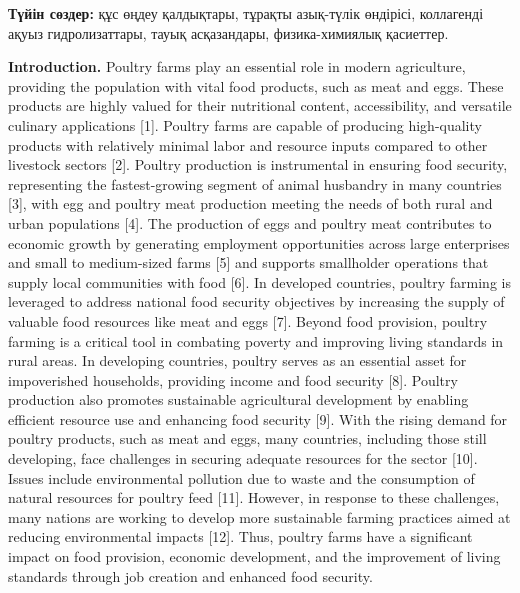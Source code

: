 {\bfseries Түйін сөздер:} құс өңдеу қалдықтары, тұрақты азық-түлік
өндірісі, коллагенді ақуыз гидролизаттары, тауық асқазандары,
физика-химиялық қасиеттер.

{\bfseries Introduction.} Poultry farms play an essential role in modern
agriculture, providing the population with vital food products, such as
meat and eggs. These products are highly valued for their nutritional
content, accessibility, and versatile culinary applications {[}1{]}.
Poultry farms are capable of producing high-quality products with
relatively minimal labor and resource inputs compared to other livestock
sectors {[}2{]}. Poultry production is instrumental in ensuring food
security, representing the fastest-growing segment of animal husbandry
in many countries {[}3{]}, with egg and poultry meat production meeting
the needs of both rural and urban populations {[}4{]}. The production of
eggs and poultry meat contributes to economic growth by generating
employment opportunities across large enterprises and small to
medium-sized farms {[}5{]} and supports smallholder operations that
supply local communities with food {[}6{]}. In developed countries,
poultry farming is leveraged to address national food security
objectives by increasing the supply of valuable food resources like meat
and eggs {[}7{]}. Beyond food provision, poultry farming is a critical
tool in combating poverty and improving living standards in rural areas.
In developing countries, poultry serves as an essential asset for
impoverished households, providing income and food security {[}8{]}.
Poultry production also promotes sustainable agricultural development by
enabling efficient resource use and enhancing food security {[}9{]}.
With the rising demand for poultry products, such as meat and eggs, many
countries, including those still developing, face challenges in securing
adequate resources for the sector {[}10{]}. Issues include environmental
pollution due to waste and the consumption of natural resources for
poultry feed {[}11{]}. However, in response to these challenges, many
nations are working to develop more sustainable farming practices aimed
at reducing environmental impacts {[}12{]}. Thus, poultry farms have a
significant impact on food provision, economic development, and the
improvement of living standards through job creation and enhanced food
security.

